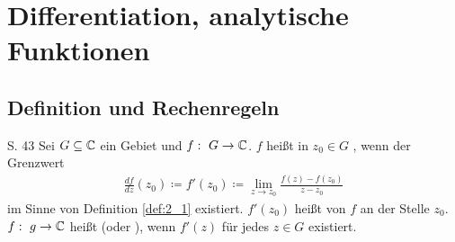 \section{Differentiation, analytische Funktionen}



\subsection{Definition und Rechenregeln}

\begin{definition}{S. 43}
  Sei $G \subseteq \mathbb{C}$ ein Gebiet und $f:\ G \to \mathbb{C}$.
  $f$ heißt in $z_0 \in G$ , wenn der Grenzwert
  \begin{align}
    \frac{df}{dz} (z_0) \coloneqq f'(z_0) \coloneqq \lim_{z \to z_0} \frac{f(z) - f(z_0)}{z - z_0}
  \end{align}
  im Sinne von Definition \ref{def:2_1} existiert.
  $f'(z_0)$ heißt  von $f$ an der Stelle $z_0$.
  $f:\ g \to \mathbb{C}$ heißt  (oder ), wenn $f'(z)$ für jedes $z \in G$ existiert.
\end{definition}

